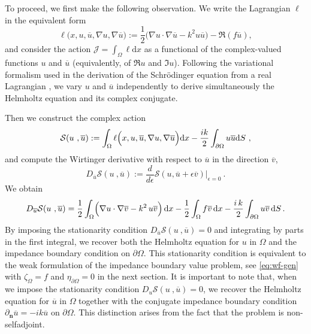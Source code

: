 \documentclass[twoside,11pt]{article}
\def\d{{\mathrm d}}
\def\ubar{\overline{u}}
\def\vbar{\overline{v}}
\begin{document}
{ 
 {To proceed, we first make the following observation. We write the Lagrangian $\ell$ in the equivalent form
\begin{equation} \label{eq:mdhlagrdens}
 \ell\Big(x, u, \ubar, \nabla u, \nabla \ubar\Big)
 := \frac12 \Big( \nabla u \cdot \nabla \ubar - k^2 u\ubar \Big)
 - \Re(f\ubar),
\end{equation}
and consider the action $\mathcal{J}=\int_{\Omega} \ell \d x$ as a functional of the complex-valued functions $u$ and $\ubar$ (equivalently, of $\Re u$ and $\Im u$). Following the variational formalism used in the derivation of the Schr\"odinger equation from a real Lagrangian \cite{Mo_book}, we vary $u$ and $\ubar$ independently to derive simultaneously the Helmholtz equation and its complex conjugate.}

 {Then we construct the complex action
\begin{equation}
\mathcal{S}(u\ , \ubar) := \int_{\Omega} \ell\Bigl(x, u, \ubar, \nabla u, \nabla \ubar\Bigr) \d x - \frac{ik}{2}\int_{\partial \Omega}u \ubar \d S \ ,
\end{equation}
and compute the Wirtinger derivative with respect to $\ubar$ in the direction $\vbar$,
\begin{equation}\label{eq:wirtubar}
D_{\ubar}\mathcal{S}(u\ , \ubar) := \frac{d}{d\epsilon}\mathcal{S}(u, \ubar+\epsilon \vbar)\Big|_{\epsilon=0} \ .
\end{equation}
We obtain
\begin{equation}\label{Section2:complexVF}
D_{\ubar}\mathcal{S}(u\ , \ubar)= \frac12 \int_\Omega \Bigl(\nabla u\cdot \nabla \vbar  - k^2 \, u\vbar\Bigr)\, \d x -\frac12 \int_\Omega f \vbar \, \d x
          -\frac{ i\, k}{2}\int_{\partial \Omega} u \vbar\, \d S \, .
\end{equation}}
 {By imposing the stationarity condition $D_{\ubar}\mathcal{S}(u\ , \ubar)=0$ and integrating by parts in the first integral, we recover both the Helmholtz equation for $u$ in $\Omega$ and the impedance boundary condition on $\partial \Omega$. This stationarity condition is equivalent to the weak formulation of the impedance boundary value problem, see \eqref{eq:wf-gen} with $\zeta_\Omega =f$ and  $\eta_{\partial\Omega} =0$ in the next section.
It is important to note that, when we impose the stationarity condition $D_{u}\mathcal{S}(u\ , \ubar)=0$, we recover the Helmholtz equation for $\ubar$ in $\Omega$ together with the conjugate impedance boundary condition
$ {\partial_{\mathbf{n}} \ubar} = -i k \ubar$ on $\partial \Omega$. This distinction arises from the fact that the problem is non-selfadjoint.}

}
\end{document}

